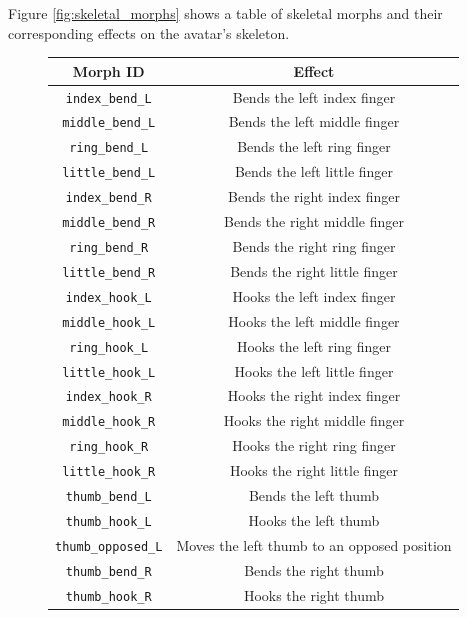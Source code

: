 \documentclass[../../main.tex]{subfiles}
\begin{document}
Figure \ref{fig:skeletal_morphs} shows a table of skeletal morphs and their corresponding effects on the avatar's skeleton.

\begin{figure}
    \centering
    \begin{tabular}{|c|c|}
        \hline
        \textbf{Morph ID} & \textbf{Effect} \\
        \hline
        \texttt{index\_bend\_L} & Bends the left index finger \\
        \texttt{middle\_bend\_L} & Bends the left middle finger \\
        \texttt{ring\_bend\_L} & Bends the left ring finger \\
        \texttt{little\_bend\_L} & Bends the left little finger \\
        \texttt{index\_bend\_R} & Bends the right index finger \\
        \texttt{middle\_bend\_R} & Bends the right middle finger \\
        \texttt{ring\_bend\_R} & Bends the right ring finger \\
        \texttt{little\_bend\_R} & Bends the right little finger \\
        \texttt{index\_hook\_L} & Hooks the left index finger \\
        \texttt{middle\_hook\_L} & Hooks the left middle finger \\
        \texttt{ring\_hook\_L} & Hooks the left ring finger \\
        \texttt{little\_hook\_L} & Hooks the left little finger \\
        \texttt{index\_hook\_R} & Hooks the right index finger \\
        \texttt{middle\_hook\_R} & Hooks the right middle finger \\
        \texttt{ring\_hook\_R} & Hooks the right ring finger \\
        \texttt{little\_hook\_R} & Hooks the right little finger \\
        \texttt{thumb\_bend\_L} & Bends the left thumb \\
        \texttt{thumb\_hook\_L} & Hooks the left thumb \\
        \texttt{thumb\_opposed\_L} & Moves the left thumb to an opposed position \\
        \texttt{thumb\_bend\_R} & Bends the right thumb \\
        \texttt{thumb\_hook\_R} & Hooks the right thumb \\

\end{tabular}
\end{figure}
\end{document}
